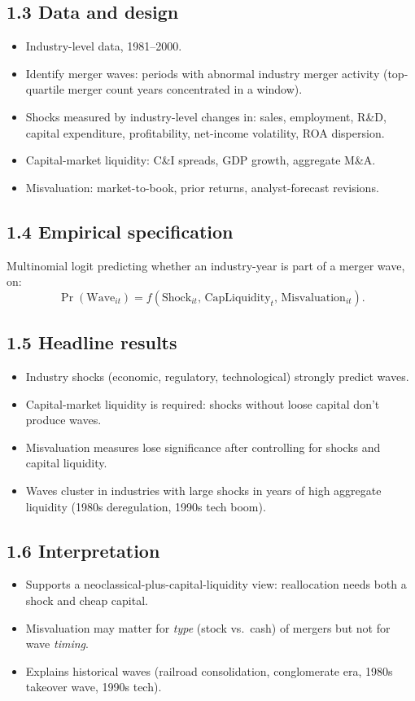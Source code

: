 \documentclass[11pt]{article}
\begin{document}
\subsection*{1.3 Data and design}
\begin{itemize}
\item Industry-level data, 1981--2000.
\item Identify merger waves: periods with abnormal industry merger activity (top-quartile merger count years concentrated in a window).
\item Shocks measured by industry-level changes in: sales, employment, R\&D, capital expenditure, profitability, net-income volatility, ROA dispersion.
\item Capital-market liquidity: C\&I spreads, GDP growth, aggregate M\&A.
\item Misvaluation: market-to-book, prior returns, analyst-forecast revisions.
\end{itemize}

\subsection*{1.4 Empirical specification}
Multinomial logit predicting whether an industry-year is part of a merger wave, on:
\[
\Pr(\text{Wave}_{it})=f(\text{Shock}_{it},\,\text{CapLiquidity}_t,\,\text{Misvaluation}_{it}).
\]

\subsection*{1.5 Headline results}
\begin{itemize}
\item Industry shocks (economic, regulatory, technological) strongly predict waves.
\item Capital-market liquidity is required: shocks without loose capital don't produce waves.
\item Misvaluation measures lose significance after controlling for shocks and capital liquidity.
\item Waves cluster in industries with large shocks in years of high aggregate liquidity (1980s deregulation, 1990s tech boom).
\end{itemize}

\subsection*{1.6 Interpretation}
\begin{itemize}
\item Supports a neoclassical-plus-capital-liquidity view: reallocation needs both a shock and cheap capital.
\item Misvaluation may matter for \emph{type} (stock vs.\ cash) of mergers but not for wave \emph{timing}.
\item Explains historical waves (railroad consolidation, conglomerate era, 1980s takeover wave, 1990s tech).
\end{itemize}
\end{document}
